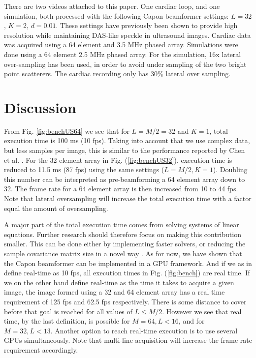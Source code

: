 \documentclass[conference]{IEEEtran}
\begin{document}
There are two videos attached to this paper. One cardiac loop, 
and one simulation, both 
processed with the following Capon beamformer settings: $L = 32$, $K = 2$, $d=0.01$. These settings have previously been shown to provide high resolution while maintaining DAS-like speckle \cite{Synnevag2007a} in ultrasound images. Cardiac data was acquired using a 64 element and 3.5 MHz phased array. Simulations were done using a 64 element 2.5 MHz phased array. For the simulation, 16x lateral over-sampling has been used, in order to avoid under sampling of the two bright point scatterers. The cardiac recording only has $30\%$ lateral over sampling.

\section{Discussion}
From Fig. \ref{fig:benchUS64} we see that for $L = M/2 = 32$ and $K=1$, total execution time is 100 ms (10 fps). Taking into account that we use complex data, but less samples per image, this is similar to the performance reported by Chen et al. \cite{Chen2011}. For the 32 element array in Fig. (\ref{fig:benchUS32}), execution time is reduced to 11.5 ms (87 fps) using the same settings ($L=M/2, K = 1$). Doubling this number can be interpreted as pre-beamforming a 64 element array down to 32. The frame rate for a 64 element array is then increased from 10 to 44 fps. Note that lateral oversampling will increase the total execution time with a factor equal the amount of oversampling.  

A major part of the total execution time comes from solving systems of linear equations. Further research should therefore focus on making this contribution smaller. This can be done either by implementing faster solvers, or reducing the sample covariance matrix size in a novel way \cite{Nilsen2009}. %
As for now, we have shown that the Capon beamformer can be implemented in a GPU framework. And if we as in \cite{Chen2011} define real-time as 10 fps, all execution times  in Fig. (\ref{fig:bench}) are real time. If we on the other hand define real-time as the time it takes to acquire a given image, the image formed using a 32 and 64 element array has a real time requirement of 125 fps and 62.5 fps respectively. There is some distance to cover before that goal is reached for all values of $L \le M/2$. However we see that real time, by the last definition, is possible for $M=64, L < 16$, and for $M = 32, L < 13$. Another option to reach real-time execution is to use several GPUs simultaneously. Note that multi-line acquisition will increase the frame rate requirement accordingly.
 
\end{document}
